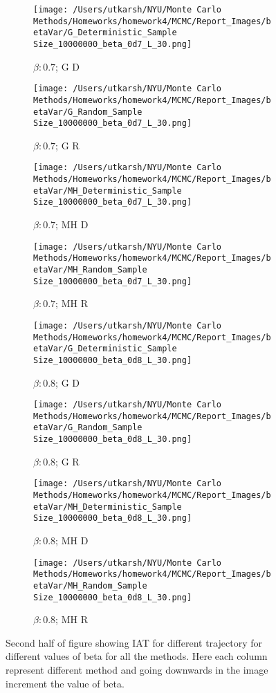\documentclass[11pt]{article}
\begin{document}
\begin{figure}[H]
	\begin{subfigure}{.23\textwidth}
		\texttt{[image: /Users/utkarsh/NYU/Monte Carlo Methods/Homeworks/homework4/MCMC/Report\_Images/betaVar/G\_Deterministic\_Sample Size\_10000000\_beta\_0d7\_L\_30.png]}
		\caption{$\beta: 0.7$; G D}
	\end{subfigure}
	\begin{subfigure}{.23\textwidth}
		\texttt{[image: /Users/utkarsh/NYU/Monte Carlo Methods/Homeworks/homework4/MCMC/Report\_Images/betaVar/G\_Random\_Sample Size\_10000000\_beta\_0d7\_L\_30.png]}
		\caption{$\beta: 0.7$; G R}
	\end{subfigure}
	\begin{subfigure}{.23\textwidth}
		\texttt{[image: /Users/utkarsh/NYU/Monte Carlo Methods/Homeworks/homework4/MCMC/Report\_Images/betaVar/MH\_Deterministic\_Sample Size\_10000000\_beta\_0d7\_L\_30.png]}
		\caption{$\beta: 0.7$; MH D}
	\end{subfigure}
	\begin{subfigure}{.23\textwidth}
		\texttt{[image: /Users/utkarsh/NYU/Monte Carlo Methods/Homeworks/homework4/MCMC/Report\_Images/betaVar/MH\_Random\_Sample Size\_10000000\_beta\_0d7\_L\_30.png]}
		\caption{$\beta: 0.7$; MH R}
	\end{subfigure}

	\begin{subfigure}{.23\textwidth}
		\texttt{[image: /Users/utkarsh/NYU/Monte Carlo Methods/Homeworks/homework4/MCMC/Report\_Images/betaVar/G\_Deterministic\_Sample Size\_10000000\_beta\_0d8\_L\_30.png]}
		\caption{$\beta: 0.8$; G D}
	\end{subfigure}
	\begin{subfigure}{.23\textwidth}
		\texttt{[image: /Users/utkarsh/NYU/Monte Carlo Methods/Homeworks/homework4/MCMC/Report\_Images/betaVar/G\_Random\_Sample Size\_10000000\_beta\_0d8\_L\_30.png]}
		\caption{$\beta: 0.8$; G R}
	\end{subfigure}
	\begin{subfigure}{.23\textwidth}
		\texttt{[image: /Users/utkarsh/NYU/Monte Carlo Methods/Homeworks/homework4/MCMC/Report\_Images/betaVar/MH\_Deterministic\_Sample Size\_10000000\_beta\_0d8\_L\_30.png]}
		\caption{$\beta: 0.8$; MH D}
	\end{subfigure}
	\begin{subfigure}{.23\textwidth}
		\texttt{[image: /Users/utkarsh/NYU/Monte Carlo Methods/Homeworks/homework4/MCMC/Report\_Images/betaVar/MH\_Random\_Sample Size\_10000000\_beta\_0d8\_L\_30.png]}
		\caption{$\beta: 0.8$; MH R}
	\end{subfigure}
	\caption{Second half of figure showing IAT for different trajectory for different values of beta for all the methods. Here each column represent different method and going downwards in the image increment the value of beta.}
	\label{fig:iat_betas_gibbs_part2}
\end{figure}
\end{document}

